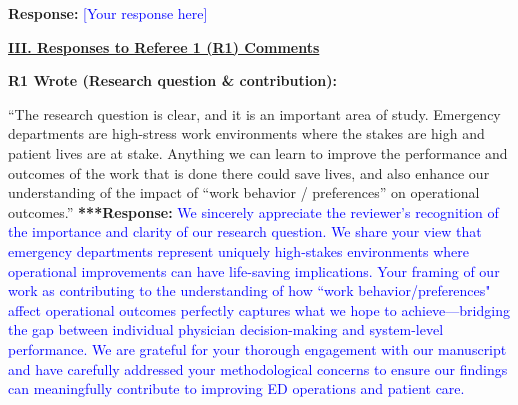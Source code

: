 \documentclass[11pt]{article}
\newenvironment{quote2}
{ \bigskip
\noindent
         \small\em
         \baselineskip=14pt
}
\newcommand{\1}{\hbox{\rm 1\kern-.35em 1}}
\begin{document}
\noindent\textbf{Response:} \textcolor{blue}{[Your response here]}




\clearpage


\pagestyle{fancy}
\fancyhead{}
\renewcommand{\headrulewidth}{0pt}

\noindent\underline{\textbf{III. Responses to Referee 1 (R1) Comments}}

\begin{quote2}
\textbf{R1 Wrote (Research question \& contribution):}  

\noindent``The research question is clear, and it is an important area of study. Emergency departments are
high-stress work environments where the stakes are high and patient lives are at stake.
Anything we can learn to improve the performance and outcomes of the work that is done there
could save lives, and also enhance our understanding of the impact of “work behavior /
preferences” on operational outcomes.” 
\end{quote2}

\noindent\textbf{***Response:} \textcolor{blue}{We sincerely appreciate the reviewer's recognition of the importance and clarity of our research question. We share your view that emergency departments represent uniquely high-stakes environments where operational improvements can have life-saving implications. Your framing of our work as contributing to the understanding of how ``work behavior/preferences" affect operational outcomes perfectly captures what we hope to achieve—bridging the gap between individual physician decision-making and system-level performance. We are grateful for your thorough engagement with our manuscript and have carefully addressed your methodological concerns to ensure our findings can meaningfully contribute to improving ED operations and patient care.}
\end{document}
